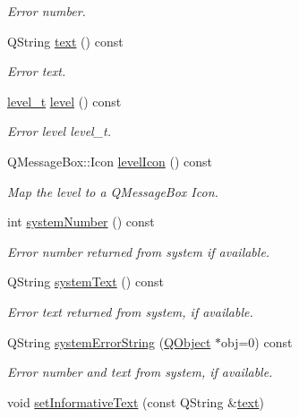\begin{DoxyCompactItemize}
\begin{DoxyCompactList}\small\item\em Error number. \end{DoxyCompactList}\item 
Q\-String \hyperlink{classmdt_error_a8630bb6b21b70edfe3d13eaff82a1baf}{text} () const 
\begin{DoxyCompactList}\small\item\em Error text. \end{DoxyCompactList}\item 
\hyperlink{classmdt_error_a5c8b1a040e2feaa848f6201d6b6f0cd7}{level\-\_\-t} \hyperlink{classmdt_error_a8d8382d3008de890689df415deb7766e}{level} () const 
\begin{DoxyCompactList}\small\item\em Error level  level\-\_\-t. \end{DoxyCompactList}\item 
Q\-Message\-Box\-::\-Icon \hyperlink{classmdt_error_aac5a7cec9a5d4364f9331c80e1eafe99}{level\-Icon} () const 
\begin{DoxyCompactList}\small\item\em Map the level to a Q\-Message\-Box Icon. \end{DoxyCompactList}\item 
int \hyperlink{classmdt_error_a1be3f45cd56b3142f50c288df9f53204}{system\-Number} () const 
\begin{DoxyCompactList}\small\item\em Error number returned from system if available. \end{DoxyCompactList}\item 
Q\-String \hyperlink{classmdt_error_a6cd449e657f321b86d234269b5e92cda}{system\-Text} () const 
\begin{DoxyCompactList}\small\item\em Error text returned from system, if available. \end{DoxyCompactList}\item 
Q\-String \hyperlink{classmdt_error_a28d22c0b9341faacfef22a7deae2da3c}{system\-Error\-String} (\hyperlink{class_q_object}{Q\-Object} $\ast$obj=0) const 
\begin{DoxyCompactList}\small\item\em Error number and text from system, if available. \end{DoxyCompactList}\item 
void \hyperlink{classmdt_error_a8ef108a0502df7875f1b54bbb2a8919d}{set\-Informative\-Text} (const Q\-String \&\hyperlink{classmdt_error_a8630bb6b21b70edfe3d13eaff82a1baf}{text})

\end{DoxyCompactItemize}
